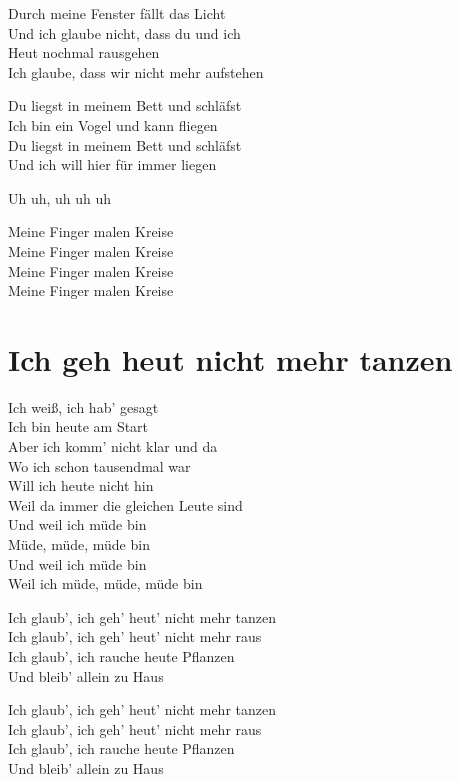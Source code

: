\documentclass[]{book}
\begin{document}
Durch meine Fenster fällt das Licht\\
Und ich glaube nicht, dass du und ich\\
Heut nochmal rausgehen\\
Ich glaube, dass wir nicht mehr aufstehen

Du liegst in meinem Bett und schläfst\\
Ich bin ein Vogel und kann fliegen\\
Du liegst in meinem Bett und schläfst\\
Und ich will hier für immer liegen

Uh uh, uh uh uh

Meine Finger malen Kreise\\
Meine Finger malen Kreise\\
Meine Finger malen Kreise\\
Meine Finger malen Kreise

\hypertarget{ich-geh-heut-nicht-mehr-tanzen}{%
\section{Ich geh heut nicht mehr tanzen}\label{ich-geh-heut-nicht-mehr-tanzen}}

Ich weiß, ich hab' gesagt\\
Ich bin heute am Start\\
Aber ich komm' nicht klar und da\\
Wo ich schon tausendmal war\\
Will ich heute nicht hin\\
Weil da immer die gleichen Leute sind\\
Und weil ich müde bin\\
Müde, müde, müde bin\\
Und weil ich müde bin\\
Weil ich müde, müde, müde bin

Ich glaub', ich geh' heut' nicht mehr tanzen\\
Ich glaub', ich geh' heut' nicht mehr raus\\
Ich glaub', ich rauche heute Pflanzen\\
Und bleib' allein zu Haus

Ich glaub', ich geh' heut' nicht mehr tanzen\\
Ich glaub', ich geh' heut' nicht mehr raus\\
Ich glaub', ich rauche heute Pflanzen\\
Und bleib' allein zu Haus
\end{document}
